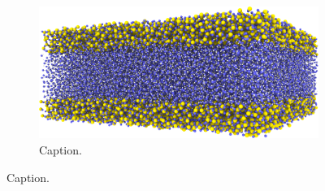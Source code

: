 \begin{figure}[htpb]
\begin{subfigure}[b]{\myfigwidth}
        \centering%
        \includegraphics[width=\textwidth]{images/systems/trimmed-flat_fracture03_03}%
        \caption{Caption.}%
    \end{subfigure}%
    \caption{%
        Caption. %
        \label{fig:flat_fractures}%
    }%
\end{figure}%
%
\FloatBarrier